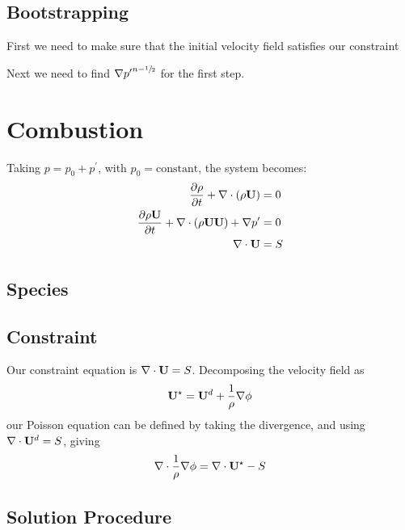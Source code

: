 \subsection{Bootstrapping}

First we need to make sure that the initial velocity field satisfies our constraint

Next we need to find $\nabla {p^\prime}^{n-{\sfrac{1}{2}}}$ for the first step.



\section{Combustion}


Taking $p = p_0 + p^\prime$, with $p_0 = \mathrm{constant}$, the system 
becomes:
\begin{align}
\frac{\partial \rho}{\partial t} + \nabla \cdot (\rho {\bf U}) &= 0 \\
\frac{\partial \rho {\bf U}}{\partial t} + \nabla \cdot (\rho {\bf U} {\bf U}) + \nabla p^\prime &= 0 \\
\nabla \cdot {\bf U} &= S
\end{align}

\subsection{Species}


\subsection{Constraint}

Our constraint equation is $\nabla \cdot {\bf U} = S$.  Decomposing the
velocity field as
\begin{equation}
{\bf U}^\star = {\bf U}^d + \frac{1}{\rho} \nabla \phi
\end{equation}
our Poisson equation can be defined by taking the divergence, and
using $\nabla \cdot {\bf U}^d = S$, giving
\begin{equation}
\nabla \cdot \frac{1}{\rho} \nabla \phi = \nabla \cdot {\bf U}^\star - S
\end{equation}


\subsection{Solution Procedure}

